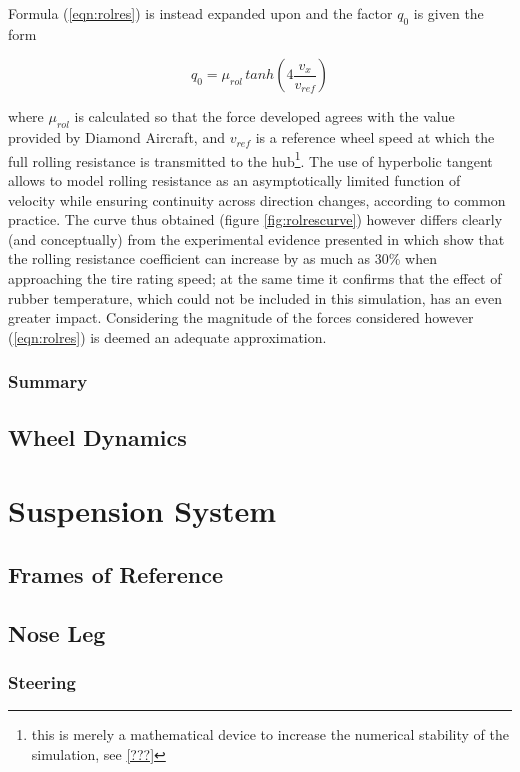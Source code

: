 \documentclass[12pt,a4paper]{report}
\newcommand{\eq}[2]{
\begin{equation} \label{#1}
#2
\end{equation}
}
\newcommand{\req}[1]{
(\ref{#1})
}
\begin{document}
Formula \req{eqn:rolres} is instead expanded upon and the factor $q_0$ is given the form
\eq{eqn:rolresfactor}{q_0 = \mu_{rol} \, tanh(4\frac{v_x}{v_{ref}})}
where $\mu_{rol}$ is calculated so that the force developed agrees with the value provided by Diamond Aircraft, and $v_{ref}$ is a reference wheel speed at which the full rolling resistance is transmitted to the hub\footnote{this is merely a mathematical device to increase the numerical stability of the simulation, see \ref{???}}.
The use of hyperbolic tangent allows to model rolling resistance as an asymptotically limited function of velocity while ensuring continuity across direction changes, according to common practice. The curve thus obtained (figure \ref{fig:rolrescurve}) however differs clearly (and conceptually) from the experimental evidence presented in \citep{nhtsa} which show that the rolling resistance coefficient can increase by as much as 30\% when approaching the tire rating speed; at the same time it confirms that the effect of rubber temperature, which could not be included in this simulation, has an even greater impact. Considering the magnitude of the forces considered however \req{eqn:rolres} is deemed an adequate approximation.


\subsection{Summary}

\section{Wheel Dynamics}



\chapter{Suspension System}
\section{Frames of Reference}
\section{Nose Leg}
\subsection{Steering}
\end{document}
